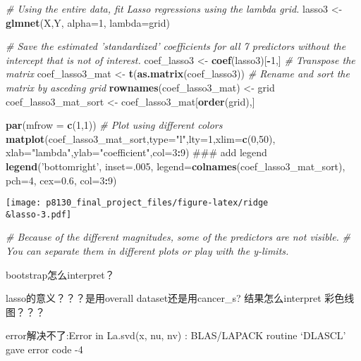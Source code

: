 \documentclass[]{article}
\newenvironment{Shaded}{\begin{snugshade}}{\end{snugshade}}
\newcommand{\KeywordTok}[1]{\textcolor[rgb]{0.13,0.29,0.53}{\textbf{#1}}}
\newcommand{\DataTypeTok}[1]{\textcolor[rgb]{0.13,0.29,0.53}{#1}}
\newcommand{\DecValTok}[1]{\textcolor[rgb]{0.00,0.00,0.81}{#1}}
\newcommand{\FloatTok}[1]{\textcolor[rgb]{0.00,0.00,0.81}{#1}}
\newcommand{\StringTok}[1]{\textcolor[rgb]{0.31,0.60,0.02}{#1}}
\newcommand{\CommentTok}[1]{\textcolor[rgb]{0.56,0.35,0.01}{\textit{#1}}}
\newcommand{\OperatorTok}[1]{\textcolor[rgb]{0.81,0.36,0.00}{\textbf{#1}}}
\newcommand{\NormalTok}[1]{#1}
\begin{document}
\begin{Shaded}
\begin{Highlighting}[]
\CommentTok{# Using the entire data, fit Lasso regressions using the lambda grid.}
\NormalTok{lasso3 <-}\StringTok{ }\KeywordTok{glmnet}\NormalTok{(X,Y, }\DataTypeTok{alpha=}\DecValTok{1}\NormalTok{, }\DataTypeTok{lambda=}\NormalTok{grid)}

\CommentTok{# Save the estimated 'standardized' coefficients for all 7 predictors without the intercept that is not of interest.}
\NormalTok{coef_lasso3 <-}\StringTok{ }\KeywordTok{coef}\NormalTok{(lasso3)[}\OperatorTok{-}\DecValTok{1}\NormalTok{,]}
\CommentTok{# Transpose the matrix}
\NormalTok{coef_lasso3_mat <-}\StringTok{ }\KeywordTok{t}\NormalTok{(}\KeywordTok{as.matrix}\NormalTok{(coef_lasso3))}
\CommentTok{# Rename and sort the matrix by asceding  grid}
\KeywordTok{rownames}\NormalTok{(coef_lasso3_mat) <-}\StringTok{ }\NormalTok{grid}
\NormalTok{coef_lasso3_mat_sort <-}\StringTok{ }\NormalTok{coef_lasso3_mat[}\KeywordTok{order}\NormalTok{(grid),]}

\KeywordTok{par}\NormalTok{(}\DataTypeTok{mfrow =} \KeywordTok{c}\NormalTok{(}\DecValTok{1}\NormalTok{,}\DecValTok{1}\NormalTok{))}
\CommentTok{# Plot using different colors}
\KeywordTok{matplot}\NormalTok{(coef_lasso3_mat_sort,}\DataTypeTok{type=}\StringTok{"l"}\NormalTok{,}\DataTypeTok{lty=}\DecValTok{1}\NormalTok{,}\DataTypeTok{xlim=}\KeywordTok{c}\NormalTok{(}\DecValTok{0}\NormalTok{,}\DecValTok{50}\NormalTok{),}
        \DataTypeTok{xlab=}\StringTok{"lambda"}\NormalTok{,}\DataTypeTok{ylab=}\StringTok{"coefficient"}\NormalTok{,}\DataTypeTok{col=}\DecValTok{3}\OperatorTok{:}\DecValTok{9}\NormalTok{) }
\NormalTok{### add legend}
\KeywordTok{legend}\NormalTok{(}\StringTok{'bottomright'}\NormalTok{, }\DataTypeTok{inset=}\NormalTok{.}\DecValTok{005}\NormalTok{, }\DataTypeTok{legend=}\KeywordTok{colnames}\NormalTok{(coef_lasso3_mat_sort), }
       \DataTypeTok{pch=}\DecValTok{4}\NormalTok{, }\DataTypeTok{cex=}\FloatTok{0.6}\NormalTok{, }\DataTypeTok{col=}\DecValTok{3}\OperatorTok{:}\DecValTok{9}\NormalTok{)}
\end{Highlighting}
\end{Shaded}

\texttt{[image: p8130\_final\_project\_files/figure-latex/ridge\\\&lasso-3.pdf]}

\begin{Shaded}
\begin{Highlighting}[]
\CommentTok{# Because of the different magnitudes, some of the predictors are not visible.}
\CommentTok{# You can separate them in different plots or play with the y-limits.}
\end{Highlighting}
\end{Shaded}

bootstrap怎么interpret？

lasso的意义？？？是用overall dataset还是用cancer\_s? 结果怎么interpret
彩色线图？？？

error解决不了:Error in La.svd(x, nu, nv) : BLAS/LAPACK routine `DLASCL'
gave error code -4
\end{document}
